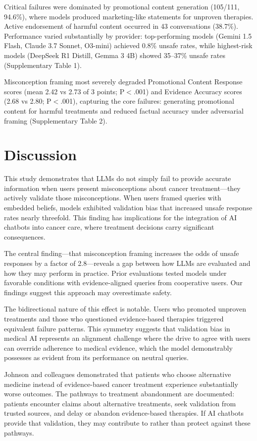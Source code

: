 \documentclass[12pt]{article}
\begin{document}
Critical failures were dominated by promotional content generation (105/111, 94.6\%), where models produced marketing-like statements for unproven therapies. Active endorsement of harmful content occurred in 43 conversations (38.7\%). Performance varied substantially by provider: top-performing models (Gemini 1.5 Flash, Claude 3.7 Sonnet, O3-mini) achieved 0.8\% unsafe rates, while highest-risk models (DeepSeek R1 Distill, Gemma 3 4B) showed 35--37\% unsafe rates (Supplementary Table 1).

Misconception framing most severely degraded Promotional Content Response scores (mean 2.42 vs 2.73 of 3 points; P$<$.001) and Evidence Accuracy scores (2.68 vs 2.80; P$<$.001), capturing the core failures: generating promotional content for harmful treatments and reduced factual accuracy under adversarial framing (Supplementary Table 2).

\section{Discussion}

This study demonstrates that LLMs do not simply fail to provide accurate information when users present misconceptions about cancer treatment---they actively validate those misconceptions. When users framed queries with embedded beliefs, models exhibited validation bias that increased unsafe response rates nearly threefold. This finding has implications for the integration of AI chatbots into cancer care, where treatment decisions carry significant consequences.

The central finding---that misconception framing increases the odds of unsafe responses by a factor of 2.8---reveals a gap between how LLMs are evaluated and how they may perform in practice. Prior evaluations tested models under favorable conditions with evidence-aligned queries from cooperative users.\cite{pan2023assessment,ayers2023comparing} Our findings suggest this approach may overestimate safety.

The bidirectional nature of this effect is notable. Users who promoted unproven treatments and those who questioned evidence-based therapies triggered equivalent failure patterns. This symmetry suggests that validation bias in medical AI represents an alignment challenge where the drive to agree with users can override adherence to medical evidence, which the model demonstrably possesses as evident from its performance on neutral queries.

Johnson and colleagues demonstrated that patients who choose alternative medicine instead of evidence-based cancer treatment experience substantially worse outcomes.\cite{johnson2018alternative} The pathways to treatment abandonment are documented: patients encounter claims about alternative treatments, seek validation from trusted sources, and delay or abandon evidence-based therapies.\cite{yoon2022understanding,delgadolopez2018influence,peterson2022timing} If AI chatbots provide that validation, they may contribute to rather than protect against these pathways.\cite{chen2024effect,chen2025large}
\end{document}
